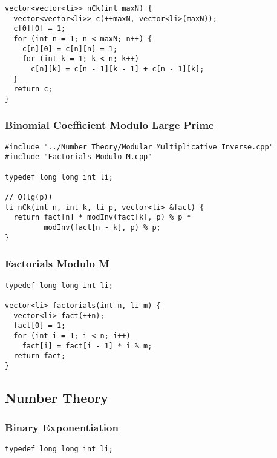 \documentclass[twoside]{article}
\begin{document}
\begin{multicols*}{2}
\begin{verbatim}
vector<vector<li>> nCk(int maxN) {
  vector<vector<li>> c(++maxN, vector<li>(maxN));
  c[0][0] = 1;
  for (int n = 1; n < maxN; n++) {
    c[n][0] = c[n][n] = 1;
    for (int k = 1; k < n; k++)
      c[n][k] = c[n - 1][k - 1] + c[n - 1][k];
  }
  return c;
}
\end{verbatim}

\subsubsectionfont{\large\bfseries\sffamily\underline}
\subsubsection*{Binomial Coefficient Modulo Large Prime}
\begin{verbatim}
#include "../Number Theory/Modular Multiplicative Inverse.cpp"
#include "Factorials Modulo M.cpp"

typedef long long int li;

// O(lg(p))
li nCk(int n, int k, li p, vector<li> &fact) {
  return fact[n] * modInv(fact[k], p) % p *
         modInv(fact[n - k], p) % p;
}
\end{verbatim}

\subsubsectionfont{\large\bfseries\sffamily\underline}
\subsubsection*{Factorials Modulo M}
\begin{verbatim}
typedef long long int li;

vector<li> factorials(int n, li m) {
  vector<li> fact(++n);
  fact[0] = 1;
  for (int i = 1; i < n; i++)
    fact[i] = fact[i - 1] * i % m;
  return fact;
}
\end{verbatim}

\subsectionfont{\bfseries\sffamily\centering\LARGE}
\vspace{0em}
\subsection*{Number Theory}
\vspace{2em}
\subsubsectionfont{\large\bfseries\sffamily\underline}
\subsubsection*{Binary Exponentiation}
\begin{verbatim}
typedef long long int li;


\end{verbatim}
\end{multicols*}
\end{document}
